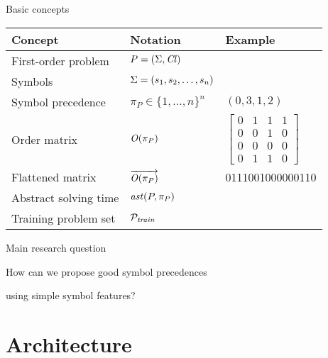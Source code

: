 \documentclass[notes]{beamer}
\begin{document}
\begin{frame}{Basic concepts}
\begin{table}
\begin{tabular}{lll}
	Concept & Notation & Example \\
	\hline
	First-order problem & $P = (\operatorname{\Sigma}, \operatorname{\mathit{Cl}})$ & \\
	Symbols & $\operatorname{\Sigma} = (s_1, s_2, \ldots, s_n)$ & \\
	Symbol precedence & $\pi_P \in \{1, \ldots, n\}^n$ & $(0, 3, 1, 2)$ \\
	Order matrix & $\operatorname{\mathit{O}}(\pi_P)$ & $\begin{bmatrix}
	0 & 1 & 1 & 1 \\
	0 & 0 & 1 & 0 \\
	0 & 0 & 0 & 0 \\
	0 & 1 & 1 & 0
	\end{bmatrix}$ \\
	Flattened matrix & $\overrightarrow{\operatorname{\mathit{O}}(\pi_P)}$ & 0111001000000110 \\
	Abstract solving time & $\operatorname{\mathit{ast}}(P,\pi_P)$ & \\
	Training problem set & $\mathcal{P}_{\mathit{train}}$ & \\
\end{tabular}
\end{table}
\end{frame}

\begin{frame}{Main research question}

\centering

How can we propose good symbol precedences

using simple symbol features?

\end{frame}

\section{Architecture}
\end{document}
